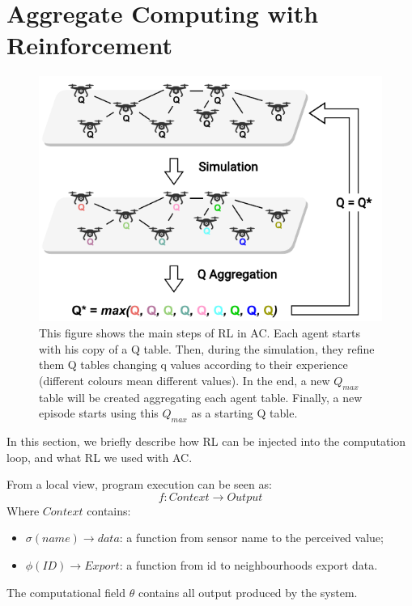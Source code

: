 \documentclass[conference]{IEEEtran}
\begin{document}
\section{Aggregate Computing with Reinforcement}\label{aggregate-and-rl}
\begin{figure}
  \centering
  \includegraphics[width=\linewidth]{img/algorithm-learning.pdf}
  \caption{This figure shows the main steps of RL in AC.
  Each agent starts with his copy of a Q table. 
  Then, during the simulation, they refine them Q tables changing q values according to their experience (different colours mean different values). 
  In the end, a new $Q_{max}$ table will be created aggregating each agent table. 
  Finally, a new episode starts using this $Q_{max}$ as a starting Q table.
  }
  \label{fig:aggregate-q-learning}
\end{figure}
% 
In this section, we briefly describe how RL can be injected into the computation loop,
 and what RL we used with AC.

From a local view, program execution can be seen as:
$$
f : \textit{Context} \rightarrow \textit{Output}
$$
Where $\textit{Context}$ contains:
\begin{itemize}
  \item $\sigma(name) \rightarrow \textit{data}$: a function from sensor name to the perceived value;
  \item $\phi(\textit{ID}) \rightarrow \textit{Export}$: a function from id to neighbourhoods export data.
\end{itemize}
The computational field $\theta$ contains all output produced by the system.
\end{document}
